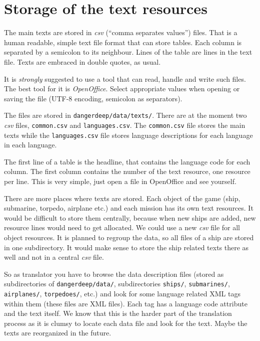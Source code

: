 \documentclass[a4paper,12pt]{report}
\begin{document}
\section{Storage of the text resources}

The main texts are stored in \emph{csv} (``comma separates values'')
files. That is a human readable, simple text file format that can store
tables. Each column is separated by a semicolon to its neighbour. Lines
of the table are lines in the text file. Texts are embraced in double
quotes, as usual.

It is \emph{strongly} suggested to use a tool that can read, handle and
write such files. The best tool for it is \emph{OpenOffice}. Select
appropriate values when opening or saving the file (UTF-8 encoding,
semicolon as separators).

The files are stored in \texttt{dangerdeep/data/texts/}. There are at
the moment two \emph{csv} files, \texttt{common.csv} and
\texttt{languages.csv}. The \texttt{common.csv} file stores the main
texts while the \texttt{languages.csv} file stores language descriptions
for each language in each language.

The first line of a table is the headline, that contains the language
code for each column. The first column contains the number of the text
resource, one resource per line. This is very simple, just open a file
in OpenOffice and see yourself.

There are more places where texts are stored. Each object of the game
(ship, submarine, torpedo, airplane etc.) and each mission has its own
text resources. It would be difficult to store them centrally, because
when new ships are added, new resource lines would need to get
allocated. We could use a new \emph{csv} file for all object resources.
It is planned to regroup the data, so all files of a ship are stored in
one subdirectory. It would make sense to store the ship related texts
there as well and not in a central \emph{csv} file.

So as translator you have to browse the data description files (stored
as subdirectories of \texttt{dangerdeep/data/}, subdirectories
\texttt{ships/}, \texttt{submarines/}, \texttt{airplanes/},
\texttt{torpedoes/}, etc.) and look for some language related XML tags
within them (these files are XML files).  Each tag has a language code
attribute and the text itself. We know that this is the harder part of
the translation process as it is clumsy to locate each data file and
look for the text. Maybe the texts are reorganized in the future.
\end{document}
